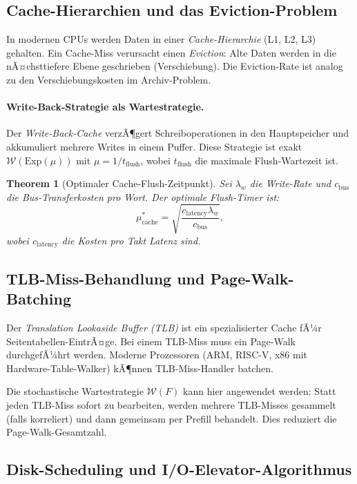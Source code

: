 ﻿\documentclass[12pt, a4paper]{article}
\newtheorem{theorem}{Theorem}[section]
\newcommand{\Exp}{\mathrm{Exp}}
\begin{document}
\subsection{Cache-Hierarchien und das Eviction-Problem}

In modernen CPUs werden Daten in einer \emph{Cache-Hierarchie} (L1, L2, L3)
gehalten. Ein Cache-Miss verursacht einen \emph{Eviction}: Alte Daten werden
in die nÃ¤chsttiefere Ebene geschrieben (Verschiebung). Die Eviction-Rate ist
analog zu den Verschiebungskosten im Archiv-Problem.

\paragraph{Write-Back-Strategie als Wartestrategie.}
Der \emph{Write-Back-Cache} verzÃ¶gert Schreiboperationen in den Hauptspeicher
und akkumuliert mehrere Writes in einem Puffer. Diese Strategie ist exakt
$\mathcal{W}(\Exp(\mu))$ mit $\mu = 1/t_{\mathrm{flush}}$, wobei
$t_{\mathrm{flush}}$ die maximale Flush-Wartezeit ist.

\begin{theorem}[Optimaler Cache-Flush-Zeitpunkt]\label{thm:cacheflush}
Sei $\lambda_w$ die Write-Rate und $c_{\mathrm{bus}}$ die Bus-Transferkosten
pro Wort. Der optimale Flush-Timer ist:
\[
  \mu^*_{\mathrm{cache}} = \sqrt{\frac{c_{\mathrm{latency}} \lambda_w}{c_{\mathrm{bus}}}},
\]
wobei $c_{\mathrm{latency}}$ die Kosten pro Takt Latenz sind.
\end{theorem}

\subsection{TLB-Miss-Behandlung und Page-Walk-Batching}

Der \emph{Translation Lookaside Buffer (TLB)} ist ein spezialisierter Cache
fÃ¼r Seitentabellen-EintrÃ¤ge. Bei einem TLB-Miss muss ein Page-Walk durchgefÃ¼hrt
werden. Moderne Prozessoren (ARM, RISC-V, x86 mit Hardware-Table-Walker)
kÃ¶nnen TLB-Miss-Handler batchen.

Die stochastische Wartestrategie $\mathcal{W}(F)$ kann hier angewendet werden:
Statt jeden TLB-Miss sofort zu bearbeiten, werden mehrere TLB-Misses gesammelt
(falls korreliert) und dann gemeinsam per Prefill behandelt. Dies reduziert die
Page-Walk-Gesamtzahl.

\subsection{Disk-Scheduling und I/O-Elevator-Algorithmus}
\end{document}
